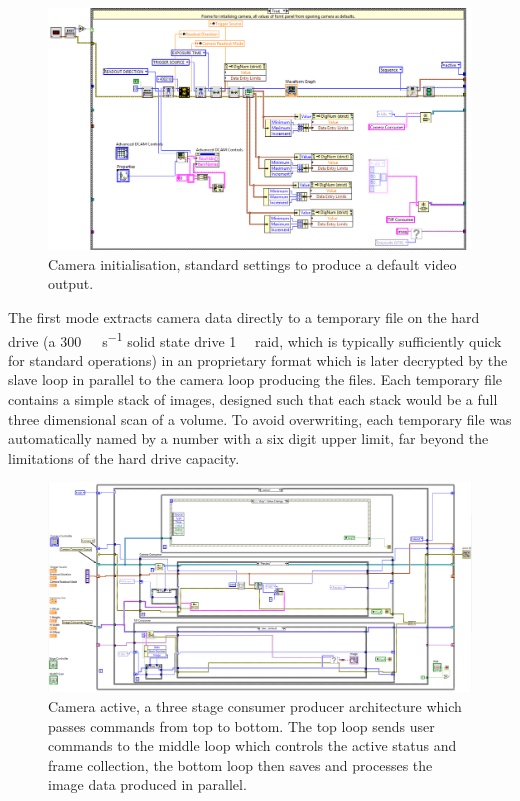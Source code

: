 \begin{figure}
	\centering
	\includegraphics[width=\linewidth]{Figures/camera_init}
	\caption[Camera initialisation state]{Camera initialisation, standard settings to produce a default video output.}
	\label{fig:camera_init}
\end{figure}

The first mode extracts camera data directly to a temporary file on the hard drive (a \SI{300}{\mega\byte\per\second}
solid state drive \SI{1}{\tera\byte}
raid, which is typically sufficiently quick for standard operations) in an proprietary format which is later decrypted by the slave loop in parallel to the camera loop producing the files.
Each temporary file contains a simple stack of images, designed such that each stack would be a full three dimensional scan of a volume.
To avoid overwriting, each temporary file was automatically named by a number with a six digit upper limit, far beyond the limitations of the hard drive capacity.

\begin{figure}
	\centering
	\includegraphics[width=\linewidth]{Figures/camera_active}
	\caption[Camera active state]{Camera active, a three stage consumer producer architecture which passes commands from top to bottom.
The top loop sends user commands to the middle loop which controls the active status and frame collection, the bottom loop then saves and processes the image data produced in parallel.}
	\label{fig:camera_active}
\end{figure}

